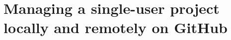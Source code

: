 \documentclass[10pt,svgnames,handout]{beamer}
\begin{document}






\section{Managing a single-user project locally and remotely on GitHub}
\end{document}
